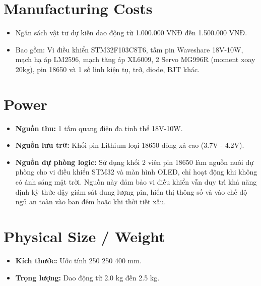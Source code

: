 \documentclass[12pt,a4paper]{report}
\begin{document}
\section{Manufacturing Costs}
\begin{itemize}[leftmargin=1.5em,itemsep=3pt]
  \item Ngân sách vật tư dự kiến dao động từ 1.000.000 VNĐ đến 1.500.000 VNĐ.
  \item Bao gồm: Vi điều khiển STM32F103C8T6, tấm pin Waveshare 18V-10W, mạch hạ áp LM2596, mạch tăng áp XL6009, 2 Servo MG996R (moment xoay 20kg), pin 18650 và 1 số linh kiện tụ, trở, diode, BJT khác.
\end{itemize}

\section{Power}
\begin{itemize}[leftmargin=1.5em,itemsep=3pt]
  \item \textbf{Nguồn thu: }1 tấm quang điện đa tinh thể 18V-10W.
  \item \textbf{Nguồn lưu trữ: }Khối pin Lithium loại 18650 dòng xả cao (3.7V - 4.2V).
  \item \textbf{Nguồn dự phòng logic: }Sử dụng khối 2 viên pin 18650 làm nguồn nuôi dự phòng cho vi điều khiển STM32 và màn hình OLED, chỉ hoạt động khi không có ánh sáng mặt trời. Nguồn này đảm bảo vi điều khiển vẫn duy trì khả năng định kỳ thức dậy giám sát dung lượng pin, hiển thị thông số và vào chế độ ngủ an toàn vào ban đêm hoặc khi thời tiết xấu.
\end{itemize}

\section{Physical Size / Weight}
\begin{itemize}[leftmargin=1.5em,itemsep=3pt]
  \item \textbf{Kích thước: }Ước tính 250 \texttimes{} 250 \texttimes{} 400 mm.
  \item \textbf{Trọng lượng: }Dao động từ 2.0 kg đến 2.5 kg.
\end{itemize}
\end{document}
